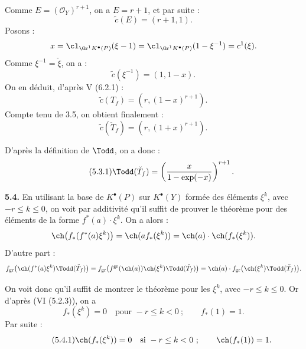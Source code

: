 Comme \(E=(\mathcal O_Y)^{r+1}\), on a \(E=r+1\), et par suite :
\[
 \widetilde c(E)=(r+1,1).
\]
Posons :
\[
 x=\cl_{\Gr^1K^{\bullet}(P)}(\xi-1)
 =
 \cl_{\Gr^1K^{\bullet}(P)}(1-\xi^{-1})
 =
 c^1(\xi).
\]
Comme \(\xi^{-1}=\check \xi\), on a :
\[
 \widetilde c(\xi^{-1})=(1,1-x).
\]
On en déduit, d'après V (6.2.1) :
\[
 \widetilde c(T_f)=(r,(1-x)^{r+1}).
\]
Compte tenu de 3.5, on obtient finalement :
\[
 \widetilde c(\check T_f)=(r,(1+x)^{r+1}).
\]

D'après la définition de \(\Todd\), on a donc :
\begin{equation}\tag{5.3.1}
 \Todd(\check T_f)=
 \left(\frac{x}{1-\exp(-x)}\right)^{r+1}.
\end{equation}

\textbf{5.4.} En utilisant la base de \(K^{\bullet}(P)\) sur \(K^{\bullet}(Y)\) formée des éléments \(\xi^k\), avec \(-r\leq k\leq0\), on voit par additivité qu'il suffit de prouver le théorème pour des éléments de la forme \(f^*(a)\cdot\xi^k\). On a alors :
\[
 \ch\bigl(f_*(f^*(a)\xi^k)\bigr)
 =
 \ch(a f_*(\xi^k))
 =
 \ch(a)\cdot\ch(f_*(\xi^k)).
\]
D'autre part :
\[
 f_{\mathrm{gr}}\bigl(\ch(f^*(a)\xi^k)\Todd(\check T_f)\bigr)
 =
 f_{\mathrm{gr}}\bigl(f^{\mathrm{gr}}(\ch(a))\ch(\xi^k)\Todd(\check T_f)\bigr)
 =
 \ch(a)\cdot f_{\mathrm{gr}}\bigl(\ch(\xi^k)\Todd(\check T_f)\bigr).
\]

On voit donc qu'il suffit de montrer le théorème pour les \(\xi^k\), avec \(-r\leq k\leq0\). Or d'après (VI (5.2.3)), on a
\[
 f_*(\xi^k)=0\quad\text{pour }-r\leq k<0~;\qquad f_*(1)=1.
\]
Par suite :
\begin{equation}\tag{5.4.1}
 \ch(f_*(\xi^k))=0\quad\text{si }-r\leq k<0~;\qquad
 \ch(f_*(1))=1.
\end{equation}

